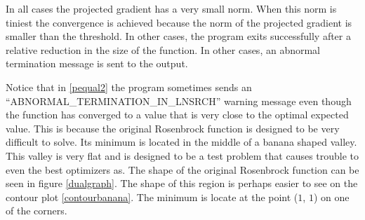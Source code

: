 In all cases the projected gradient has a very small norm. When this norm is tiniest the convergence is achieved because the norm of the projected gradient is smaller than the threshold. In other cases, the program exits successfully after a relative reduction in the size of the function. In other cases, an abnormal termination message is sent to the output.

Notice that in \eqref{pequal2} the program sometimes sends an ``ABNORMAL\_TERMINATION\_IN\_LNSRCH'' warning message even though the function has converged to a value that is very close to the optimal expected value.  This is because the original Rosenbrock function is designed to be very difficult to solve.  Its minimum is located in the middle of a banana shaped valley. This valley is very flat and is designed to be a test problem that causes trouble to even the best optimizers as. The shape of the original Rosenbrock function can be seen in figure \eqref{dualgraph}. The shape of this region is perhaps easier to see on the contour plot \eqref{contourbanana}. The minimum is locate at the point ($1$, $1$) on one of the corners.

